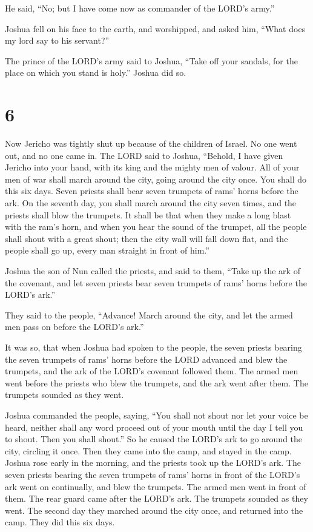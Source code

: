  He said, ``No; but I have come now as commander of the
LORD's army.''

Joshua fell on his face to the earth, and worshipped, and asked him,
``What does my lord say to his servant?''

 The prince of the LORD's army said to Joshua, ``Take off
your sandals, for the place on which you stand is holy.'' Joshua did so.

\hypertarget{section-5}{%
\section{6}\label{section-5}}

 Now Jericho was tightly shut up because of the children
of Israel. No one went out, and no one came in.  The LORD
said to Joshua, ``Behold, I have given Jericho into your hand, with its
king and the mighty men of valour.  All of your men of war
shall march around the city, going around the city once. You shall do
this six days.  Seven priests shall bear seven trumpets of
rams' horns before the ark. On the seventh day, you shall march around
the city seven times, and the priests shall blow the trumpets.
 It shall be that when they make a long blast with the
ram's horn, and when you hear the sound of the trumpet, all the people
shall shout with a great shout; then the city wall will fall down flat,
and the people shall go up, every man straight in front of him.''

 Joshua the son of Nun called the priests, and said to
them, ``Take up the ark of the covenant, and let seven priests bear
seven trumpets of rams' horns before the LORD's ark.''

 They said to the people, ``Advance! March around the
city, and let the armed men pass on before the LORD's ark.''

 It was so, that when Joshua had spoken to the people, the
seven priests bearing the seven trumpets of rams' horns before the LORD
advanced and blew the trumpets, and the ark of the LORD's covenant
followed them.  The armed men went before the priests who
blew the trumpets, and the ark went after them. The trumpets sounded as
they went.

 Joshua commanded the people, saying, ``You shall not
shout nor let your voice be heard, neither shall any word proceed out of
your mouth until the day I tell you to shout. Then you shall shout.''
 So he caused the LORD's ark to go around the city,
circling it once. Then they came into the camp, and stayed in the camp.
 Joshua rose early in the morning, and the priests took
up the LORD's ark.  The seven priests bearing the seven
trumpets of rams' horns in front of the LORD's ark went on continually,
and blew the trumpets. The armed men went in front of them. The rear
guard came after the LORD's ark. The trumpets sounded as they went.
 The second day they marched around the city once, and
returned into the camp. They did this six days.

